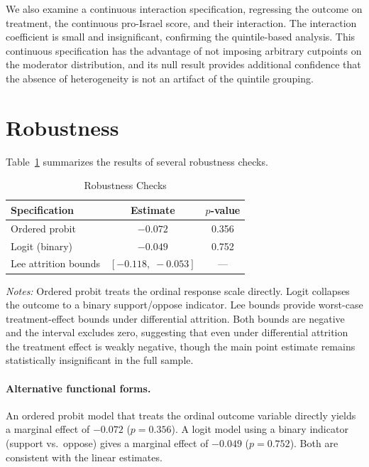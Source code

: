 \documentclass[12pt]{article}
\begin{document}
We also examine a continuous interaction specification, regressing the outcome on treatment, the continuous pro-Israel score, and their interaction. The interaction coefficient is small and insignificant, confirming the quintile-based analysis. This continuous specification has the advantage of not imposing arbitrary cutpoints on the moderator distribution, and its null result provides additional confidence that the absence of heterogeneity is not an artifact of the quintile grouping.

\section{Robustness}
\label{sec:robustness}

Table~\ref{tab:robust} summarizes the results of several robustness checks.

\begin{table}[H]
\centering
\begin{threeparttable}
\caption{Robustness Checks}
\label{tab:robust}
\begin{tabular}{lcc}
\toprule
Specification & Estimate & $p$-value \\
\midrule
Ordered probit        & $-0.072$ & 0.356 \\
Logit (binary)        & $-0.049$ & 0.752 \\
Lee attrition bounds  & $[-0.118,\; -0.053]$ & --- \\
\bottomrule
\end{tabular}
\begin{tablenotes}
\small
\item \textit{Notes:} Ordered probit treats the ordinal response scale directly. Logit collapses the outcome to a binary support/oppose indicator. Lee bounds \citep{lee2009training} provide worst-case treatment-effect bounds under differential attrition. Both bounds are negative and the interval excludes zero, suggesting that even under differential attrition the treatment effect is weakly negative, though the main point estimate remains statistically insignificant in the full sample.
\end{tablenotes}
\end{threeparttable}
\end{table}

\paragraph{Alternative functional forms.} An ordered probit model that treats the ordinal outcome variable directly yields a marginal effect of $-0.072$ ($p = 0.356$). A logit model using a binary indicator (support vs.\ oppose) gives a marginal effect of $-0.049$ ($p = 0.752$). Both are consistent with the linear estimates.
\end{document}
